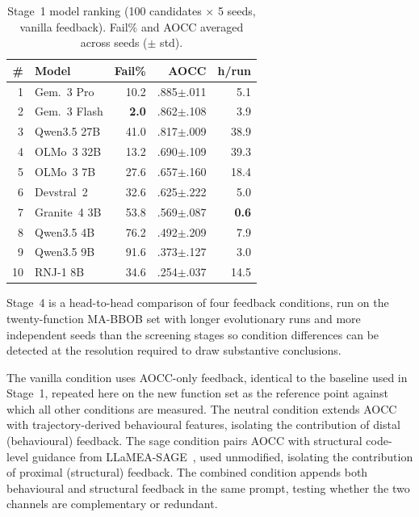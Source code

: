 \begin{table}[t]
\centering
\caption{Stage~1 model ranking (100 candidates $\times$ 5 seeds, vanilla feedback). Fail\% and AOCC averaged across seeds ($\pm$ std).}
\label{tab:model-ranking}
\footnotesize
\begin{tabular}{@{}rlrrr@{}}
\toprule
\textbf{\#} & \textbf{Model} & \textbf{Fail\%} & \textbf{AOCC} & \textbf{h/run} \\
\midrule
1  & Gem.~3 Pro    & 10.2  & .885$\pm$.011 & 5.1 \\
2  & Gem.~3 Flash  & \textbf{2.0} & .862$\pm$.108 & 3.9 \\
3  & Qwen3.5 27B   & 41.0  & .817$\pm$.009 & 38.9 \\
4  & OLMo~3 32B    & 13.2  & .690$\pm$.109 & 39.3 \\
5  & OLMo~3 7B     & 27.6  & .657$\pm$.160 & 18.4 \\
6  & Devstral~2    & 32.6  & .625$\pm$.222 & 5.0 \\
7  & Granite~4 3B  & 53.8  & .569$\pm$.087 & \textbf{0.6} \\
8  & Qwen3.5 4B    & 76.2  & .492$\pm$.209 & 7.9 \\
9  & Qwen3.5 9B    & 91.6  & .373$\pm$.127 & 3.0 \\
10 & RNJ-1 8B      & 34.6  & .254$\pm$.037 & 14.5 \\
\bottomrule
\end{tabular}
\end{table}

Stage~4 is a head-to-head comparison of four feedback conditions, run on the twenty-function MA-BBOB set with longer evolutionary runs and more independent seeds than the screening stages so condition differences can be detected at the resolution required to draw substantive conclusions.

The vanilla condition uses AOCC-only feedback, identical to the baseline used in Stage~1, repeated here on the new function set as the reference point against which all other conditions are measured. The neutral condition extends AOCC with trajectory-derived behavioural features, isolating the contribution of distal (behavioural) feedback. The sage condition pairs AOCC with structural code-level guidance from LLaMEA-SAGE~\cite{vanStein2026LLaMEASAGE}, used unmodified, isolating the contribution of proximal (structural) feedback. The combined condition appends both behavioural and structural feedback in the same prompt, testing whether the two channels are complementary or redundant.


